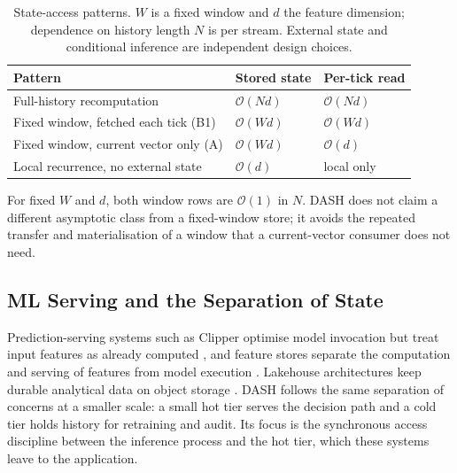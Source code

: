 \documentclass[a4paper,fleqn]{cas-dc}
\begin{document}
\begin{table}[pos=htbp]
  \centering
  \caption{State-access patterns. $W$ is a fixed window and $d$ the feature dimension; dependence on history length $N$ is per stream. External state and conditional inference are independent design choices.}
  \label{tab:paradigms}
  \small
  \begin{tabularx}{\linewidth}{@{}Y l l@{}}
    \toprule
    Pattern & Stored state & Per-tick read \\
    \midrule
    Full-history recomputation & $\mathcal{O}(Nd)$ & $\mathcal{O}(Nd)$ \\
    Fixed window, fetched each tick (B1) & $\mathcal{O}(Wd)$ & $\mathcal{O}(Wd)$ \\
    Fixed window, current vector only (A) & $\mathcal{O}(Wd)$ & $\mathcal{O}(d)$ \\
    Local recurrence, no external state & $\mathcal{O}(d)$ & local only \\
    \bottomrule
  \end{tabularx}
\end{table}

For fixed $W$ and $d$, both window rows are $\mathcal{O}(1)$ in $N$. DASH does not claim a different asymptotic class from a fixed-window store; it avoids the repeated transfer and materialisation of a window that a current-vector consumer does not need.

\subsection{ML Serving and the Separation of State}
Prediction-serving systems such as Clipper optimise model invocation but treat input features as already computed \citep{crankshaw2017clipper}, and feature stores separate the computation and serving of features from model execution \citep{delaruamartinez2024hopsworks}. Lakehouse architectures keep durable analytical data on object storage \citep{armbrust2020delta,zaharia2021lakehouse}. DASH follows the same separation of concerns at a smaller scale: a small hot tier serves the decision path and a cold tier holds history for retraining and audit. Its focus is the synchronous access discipline between the inference process and the hot tier, which these systems leave to the application.
\end{document}
